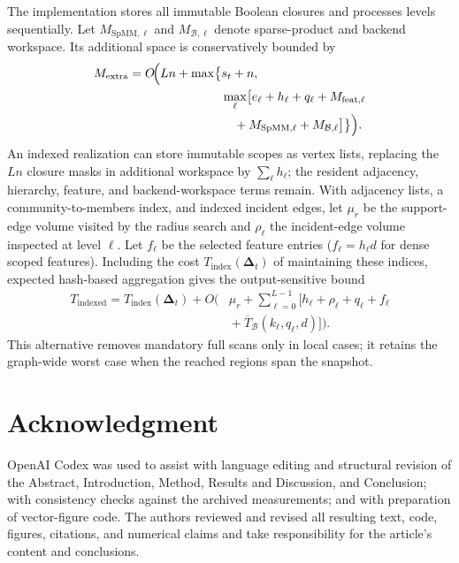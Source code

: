 \documentclass{ieeeaccess}
\begin{document}
The implementation stores all immutable Boolean closures and processes levels
sequentially. Let $M_{\mathrm{SpMM},\ell}$ and $M_{\mathcal B,\ell}$ denote
sparse-product and backend workspace. Its additional space is conservatively
bounded by
\begin{equation}
\begin{aligned}
M_{\mathrm{extra}}=O\!\Bigl(Ln+\max\bigl\{&s_t+n,\\
&\max_\ell\bigl[e_\ell+h_\ell+q_\ell+M_{\mathrm{feat},\ell}\\
&\quad{}+M_{\mathrm{SpMM},\ell}
+M_{\mathcal B,\ell}\bigr]\bigr\}\Bigr).
\end{aligned}
\label{eq:current_space}
\end{equation}
An indexed realization can store immutable scopes as vertex lists, replacing
the $Ln$ closure masks in additional workspace by $\sum_\ell h_\ell$; the
resident adjacency, hierarchy, feature, and backend-workspace terms remain.
With adjacency lists, a community-to-members index, and indexed incident edges,
let $\mu_r$ be the support-edge volume visited by the radius search and
$\rho_\ell$ the incident-edge volume inspected at level $\ell$. Let $f_\ell$
be the selected feature entries ($f_\ell=h_\ell d$ for dense scoped features).
Including the
cost $T_{\mathrm{index}}(\bm\Delta_t)$ of maintaining these indices, expected
hash-based aggregation gives the output-sensitive bound
\begin{equation}
\begin{aligned}
T_{\mathrm{indexed}}=T_{\mathrm{index}}(\bm\Delta_t)+O\!\Biggl(&\mu_r+
\sum_{\ell=0}^{L-1}\bigl[h_\ell+\rho_\ell+q_\ell+f_\ell\\
&{}+\overline T_{\mathcal B}(k_\ell,q_\ell,d)\bigr]\Biggr).
\end{aligned}
\label{eq:indexed_cost}
\end{equation}
This alternative removes mandatory full scans only in local cases; it retains
the graph-wide worst case when the reached regions span the snapshot.

\section*{Acknowledgment}
OpenAI Codex was used to assist with language editing and structural revision
of the Abstract, Introduction, Method, Results and Discussion, and Conclusion;
with consistency checks against the archived measurements; and with preparation
of vector-figure code. The authors reviewed and revised all resulting text,
code, figures, citations, and numerical claims and take responsibility for the
article's content and conclusions.
\end{document}
